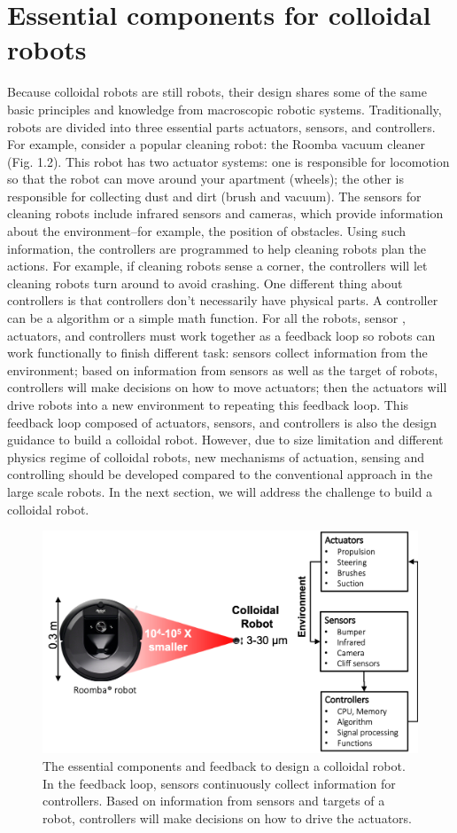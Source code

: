 \section{Essential components for colloidal robots}
Because colloidal robots are still robots, their design shares some of the same basic principles and knowledge from  macroscopic robotic systems.  Traditionally, robots are divided into three essential parts actuators, sensors, and controllers. For example, consider a popular cleaning robot: the Roomba vacuum cleaner (Fig. 1.2).  This robot has two actuator systems: one is responsible for locomotion so that the robot can move around your apartment (wheels); the other is responsible for collecting dust and dirt (brush and vacuum).
The sensors for cleaning robots include infrared  sensors and cameras, which provide information about the environment--for example, the position of obstacles. Using such information, the controllers are programmed  to help cleaning robots plan  the actions. For example, if cleaning robots sense a corner, the controllers will let cleaning robots turn around to avoid crashing. One different thing about controllers is that controllers don't necessarily have physical parts. A controller can be a algorithm or a simple math function.  For all the robots, sensor , actuators, and controllers must work together as a feedback loop so robots can work functionally to finish different task: sensors collect information from the environment; based on information from sensors as well as the target of robots,  controllers will make decisions  on how to move actuators; then the actuators will drive robots into a new environment to repeating this feedback loop. This feedback loop composed of actuators, sensors,  and controllers is also the design guidance to build a colloidal robot. However, due to size limitation and different physics regime of colloidal robots, new mechanisms of actuation, sensing and controlling should be developed compared to the conventional approach in the large scale robots.  In the next section, we will address the challenge to build a colloidal robot. 

\begin{figure}
\centering
\includegraphics[width=12cm]{figures/1_2.png}
\caption{The essential components and feedback to design a colloidal robot. In the feedback loop, sensors continuously collect information for controllers. Based on  information from sensors and targets of a robot, controllers will make decisions on how to drive the actuators.}
\label{fig:1.2}
\end{figure}


